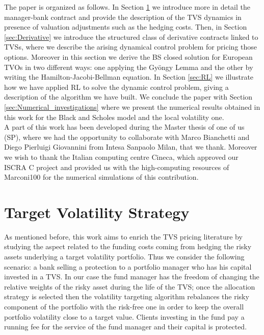 \documentclass[11pt]{article}
\begin{document}
The paper is organized as follows. In Section \ref{sec:TVS} we introduce more in detail the manager-bank contract and provide the description of the TVS dynamics in presence of valuation adjustments such as the hedging costs. Then, in Section \ref{sec:Derivative} we introduce the structured class of derivative contracts linked to TVSs, where we describe the arising dynamical control problem for pricing those options. Moreover in this section we derive the BS closed solution for European TVOs in two different ways: one applying the Gy\"ongy Lemma and the other by writing the Hamilton-Jacobi-Bellman equation. In Section \ref{sec:RL} we illustrate how we have applied RL to solve the dynamic control problem, giving a description of the algorithm we have built. We conclude the paper with Section \ref{sec:Numerical_investigations} where we present the numerical results obtained in this work for the Black and Scholes model and the local volatility one.
\\

A part of this work has been developed during the Master thesis of one of us (SP), where we had the opportunity to collaborate with Marco Bianchetti and Diego Pierluigi Giovannini from Intesa Sanpaolo Milan, that we thank. Moreover we wish to thank the Italian computing centre Cineca, which approved our ISCRA C project and provided us with the high-computing resources of Marconi100 for the numerical simulations of this contribution.


\section{Target Volatility Strategy}\label{sec:TVS}
As mentioned before, this work aims to enrich the TVS pricing literature by studying the aspect related to the funding costs coming from hedging the risky assets underlying a target volatility portfolio. Thus we consider the following scenario: a bank selling a protection to a portfolio manager who has his capital invested in a TVS. In our case the fund manager has the freedom of changing the relative weights of the risky asset during the life of the TVS; once the allocation strategy is selected then the volatility targeting algorithm rebalances the risky component of the portfolio with the risk-free one in order to keep the overall portfolio volatility close to a target value. Clients investing in the fund pay a running fee for the service of the fund manager and their capital is protected. 
\end{document}
